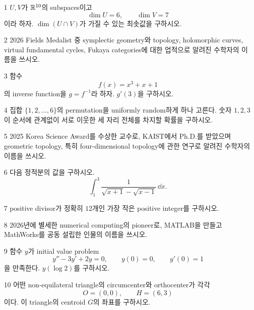 \documentclass[11pt,oneside]{article}
\begin{document}

\begin{problem}{1}
$U,V$가 $\mathbb{R}^{10}$의 subspaces이고
\[
    \dim U=6,
    \qquad
    \dim V=7
\]
이라 하자. $\dim(U\cap V)$가 가질 수 있는 최솟값을 구하시오.
\end{problem}

\begin{problem}{2}
2026 Fields Medalist 중 symplectic geometry와 topology, holomorphic curves, virtual fundamental cycles, Fukaya categories에 대한 업적으로 알려진 수학자의 이름을 쓰시오.
\end{problem}

\begin{problem}{3}
함수
\[
    f(x)=x^3+x+1
\]
의 inverse function을 $g=f^{-1}$라 하자. $g'(3)$을 구하시오.
\end{problem}

\begin{problem}{4}
집합 $\{1,2,\ldots,6\}$의 permutation을 uniformly random하게 하나 고른다. 숫자 $1,2,3$이 순서에 관계없이 서로 이웃한 세 자리 전체를 차지할 확률을 구하시오.
\end{problem}

\begin{problem}{5}
2025 Korea Science Award를 수상한 \POSTECHKorean{} 교수로, \textup{KAIST}에서 Ph.D.를 받았으며 geometric topology, 특히 four-dimensional topology에 관한 연구로 알려진 수학자의 이름을 쓰시오.
\end{problem}

\begin{problem}{6}
다음 정적분의 값을 구하시오.
\[
    \int_1^3
    \frac{1}{\sqrt{x+1}-\sqrt{x-1}}\,\dd x.
\]
\end{problem}

\newpage

\begin{problem}{7}
positive divisor가 정확히 $12$개인 가장 작은 positive integer를 구하시오.
\end{problem}

\begin{problem}{8}
2026년에 별세한 numerical computing의 pioneer로, MATLAB을 만들고 MathWorks를 공동 설립한 인물의 이름을 쓰시오.
\end{problem}

\begin{problem}{9}
함수 $y$가 initial value problem
\[
    y''-3y'+2y=0,
    \qquad
    y(0)=0,
    \qquad
    y'(0)=1
\]
을 만족한다. $y(\log 2)$를 구하시오.
\end{problem}

\begin{problem}{10}
어떤 non-equilateral triangle의 circumcenter와 orthocenter가 각각
\[
    O=(0,0),
    \qquad
    H=(6,3)
\]
이다. 이 triangle의 centroid $G$의 좌표를 구하시오.
\end{problem}
\end{document}
